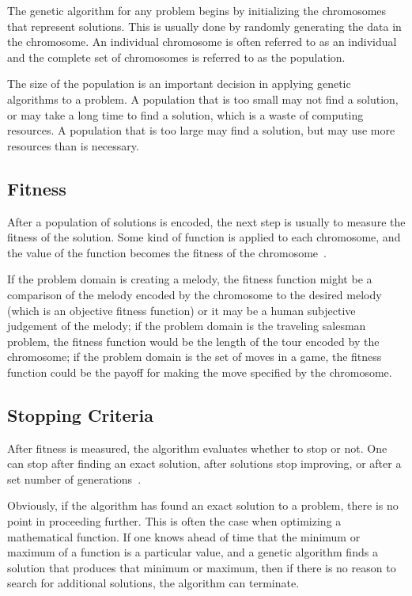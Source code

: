 The genetic algorithm for any problem begins by initializing the chromosomes
that represent solutions. This is usually done by randomly generating the data
in the chromosome. An individual chromosome is often referred to as an
individual and the complete set of chromosomes is referred to as the population.

The size of the population is an important decision in applying genetic
algorithms to a problem. A population that is too small may not find a solution,
or may take a long time to find a solution, which is a waste of computing
resources. A population that is too large may find a solution, but may use more
resources than is necessary.

\subsection{Fitness}

After a population of solutions is encoded, the next step is usually to measure
the fitness of the solution. Some kind of function is applied to each
chromosome, and the value of the function becomes the fitness of the 
chromosome~\cite{haupt2004practical}.

If the problem domain is creating a melody, the fitness function might be a
comparison of the melody encoded by the chromosome to the desired melody (which
is an objective fitness function) or it may be a human subjective judgement of
the melody; if the problem domain is the traveling salesman problem, the fitness
function would be the length of the tour encoded by the chromosome; if the
problem domain is the set of moves in a game, the fitness function could be the
payoff for making the move specified by the chromosome.

\subsection{Stopping Criteria}

After fitness is measured, the algorithm evaluates whether to stop or not. One
can stop after finding an exact solution, after solutions stop improving, or
after a set number of generations~\cite{dejong2006evolutionary}.

Obviously, if the algorithm has found an exact solution to a problem, there is
no point in proceeding further. This is often the case when optimizing a
mathematical function. If one knows ahead of time that the minimum or maximum of
a function is a particular value, and a genetic algorithm finds a solution that
produces that minimum or maximum, then if there is no reason to search for
additional solutions, the algorithm can terminate.

